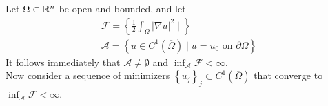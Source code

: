 \documentclass{memoir}
\begin{document}
\begin{exmp}
	Let \(\Omega \subset \mathbb{R}^{n}\) be open and bounded, and let
	\begin{align*}
		\mathcal{F} = \left\{ \frac{1}{2} \int_{\Omega } \left| \nabla u \right|^2 \mid  \right\} \\
		\mathcal{A} = \left\{ u \in C^{1}(\overline{\Omega })\mid u = u_0 \text{ on }\partial\Omega  \right\} 
	\end{align*}
	It follows immediately that \(\mathcal{A}\neq \emptyset\) and \(\inf_{\mathcal{A}} \mathcal{F} < \infty\).\\

	Now consider a sequence of minimizers \(\left\{ u_j \right\}_j \subset C^{1}(\overline{\Omega })\) that converge to \(\inf_{\mathcal{A}} \mathcal{F}< \infty\). 
\end{exmp}
\end{document}
